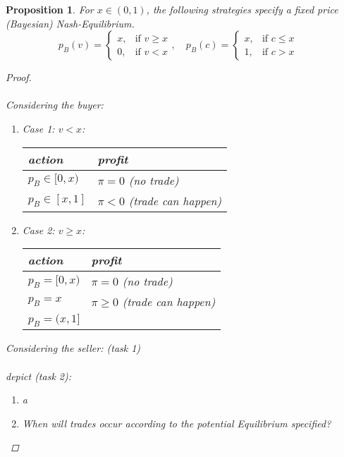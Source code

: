 \documentclass[12pt]{extreport} %
\theoremstyle{named}
\theoremstyle{nnamed}
\theoremstyle{itshape}
\theoremstyle{normal}
\newtheorem*{proposition*}{Proposition}
\begin{document}
\begin{proposition*}
	For $x \in (0, 1)$, the following strategies specify a fixed price (Bayesian) Nash-Equilibrium.
	$$ p_{B}(v) = \begin{cases} x, & \text{if } v \geq x \\ 0, & \text{if } v < x \end{cases}, \quad p_{B}(c) = \begin{cases} x, & \text{if } c \leq x \\ 1, & \text{if } c > x \end{cases} \quad  $$
	
	\begin{proof} ~\\ ~\\
	  Considering the buyer:
		\begin{enumerate}
			\item Case 1: $v < x$:
				\begin{center}
					\begin{tabular}{l|l}
  						action & profit \\
  					  	  \hline
  						$p_{B} \in [0, x)$ & $\pi = 0$ (no trade) \\
 						$p_{B} \in [x, 1]$ & $\pi < 0$ (trade can happen)
					\end{tabular}
				\end{center}
			\item Case 2: $v \geq x$: 
				\begin{center}
					\begin{tabular}{l|l}
  						action & profit \\
  					  	  \hline
  						$p_{B} = [0, x)$ & $\pi = 0$ (no trade) \\
  						$p_{B} = x$      & $\pi \geq 0$ (trade can happen) \\
 						$p_{B} = (x, 1]$ &
					\end{tabular}
				\end{center}
		\end{enumerate}
		
		Considering the seller: (task 1) ~\\ ~\\
		
		depict (task 2):
		\begin{enumerate}[label=\alph*\upshape)]
			\item a
			\item  When will trades occur according to the potential Equilibrium specified?
		\end{enumerate}
	\end{proof}
\end{proposition*}
  
\end{document}
